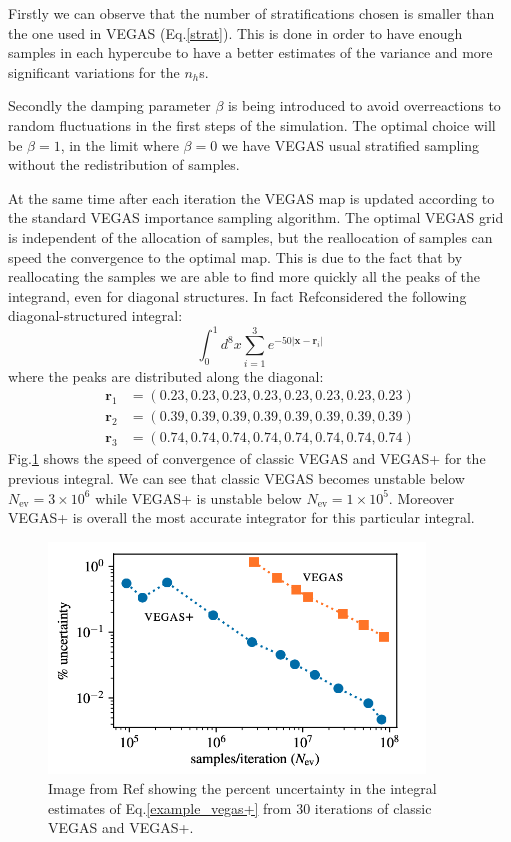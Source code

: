 \documentclass[../main/main.tex]{subfiles}
\begin{document}
Firstly we can observe that the number of stratifications chosen is smaller than the one used in VEGAS (Eq.\eqref{strat}). This is done in order to
have enough samples in each hypercube to have a better estimates of the variance and more significant variations for the $n_h$s. 

Secondly the damping parameter $\beta$ is being introduced to avoid overreactions to random fluctuations in the first steps of the simulation. The optimal choice will be $\beta=1$, in the limit where $\beta=0$ we have VEGAS usual stratified sampling without the redistribution of samples.

At the same time after each iteration the VEGAS map is updated according to the standard VEGAS importance sampling algorithm. The optimal VEGAS grid is independent of the allocation of samples, but the reallocation of samples can speed the convergence to the optimal map. This is due to the fact that by reallocating the samples we are able to find more quickly all the peaks of the integrand, even for diagonal structures.
In fact Ref\cite{Lepage:2020tgj}considered the following diagonal-structured integral:
\begin{equation}
	\label{example_vegas+}
	\int_0^1 d^8 x \sum_{i=1}^3 e^{-50 |\textbf{x}- \textbf{r}_i|}
\end{equation}
where the peaks are distributed along the diagonal:
\begin{eqnarray*}
	\textbf{r}_1 &= (0.23,0.23,0.23,0.23,0.23,0.23,0.23,0.23)  \\
	\textbf{r}_2 &= (0.39,0.39,0.39,0.39,0.39,0.39,0.39,0.39)  \\
	\textbf{r}_3 &=(0.74,0.74,0.74,0.74,0.74,0.74,0.74,0.74)  
\end{eqnarray*}
Fig.\ref{vegas_vegas+} shows the speed of convergence of classic VEGAS and VEGAS+ for the previous integral. We can see that classic VEGAS becomes unstable below $N_\text{ev} =3 \times 10^6$ while VEGAS+ is unstable below $N_\text{ev} =1 \times 10^5$. Moreover
VEGAS+ is overall the most accurate integrator for this particular integral.

\begin{figure}[h]
	\centering
	\includegraphics[width=10cm]{../images/VEGAS-VEGAS+.png}
	\caption{Image from Ref\cite{Lepage:2020tgj} showing the percent uncertainty in the integral estimates of Eq.\eqref{example_vegas+} from 30 iterations of classic VEGAS and VEGAS+.}
	\label{vegas_vegas+}
\end{figure}
\end{document}
